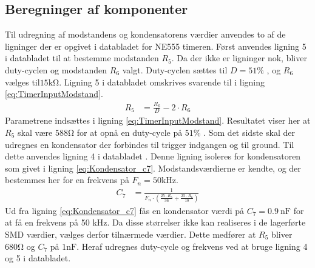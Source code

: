 \subsection{Beregninger af komponenter}
Til udregning af modstandens og kondensatorens værdier anvendes to af de ligninger der er opgivet i databladet for NE555 timeren. 
Først anvendes ligning 5 i databladet til at bestemme modstanden $R_5$. 
Da der ikke er ligninger nok, bliver duty-cyclen og modstanden $R_6$ valgt. 
Duty-cyclen sættes til $D = 51\%$  , og $R_6$ vælges til$ 15\si{\kilo\ohm}$. 
Ligning 5 \cite[Side 11.]{NE555} i databladet omskrives svarende til i ligning \ref{eq:TimerInputModstand}.
\begin{align}
R_5 & = \frac{R_6}{D} - 2 \cdot R_6 \label{eq:TimerInputModstand}
\end{align}
Parametrene indsættes i ligning \ref{eq:TimerInputModstand}.
Resultatet viser her at $R_5$ skal være $588\si{\ohm}$ for at opnå en duty-cycle på $51\%$ .
Som det sidste skal der udregnes en kondensator der forbindes til trigger indgangen og til ground. 
Til dette anvendes ligning 4 i databladet \cite[Side 11]{NE555}. Denne ligning isoleres for kondensatoren som givet i ligning \ref{eq:Kondensator_c7}.
Modstandsværdierne er kendte, og der bestemmes her for en frekvens på $F_n = 50 \si{\kilo\hertz}$.
\begin{align}
	C_7 & = \frac{1}{F_n \cdot \left( \frac{25 \cdot R_5 }{36} + \frac{25 \cdot R_6}{18} \right) \label{eq:Kondensator_c7}}
\end{align}
Ud fra ligning \ref{eq:Kondensator_c7} fås en kondensator værdi på $C_7 = \SI{0.9}{\nano\farad}$ for at få en frekvens på 50 \si{\kilo\hertz}. 
Da disse størrelser ikke kan realiseres i de lagerførte SMD værdier, vælges derfor tilnærmede værdier. 
Dette medfører at $R_5$ bliver $680\si{\ohm}$ og $C_7$ på $1\si{\nano\farad}$. 
Heraf udregnes duty-cycle og frekvens ved at bruge ligning 4 og 5 i databladet. \cite[Side 11.]{NE555}

